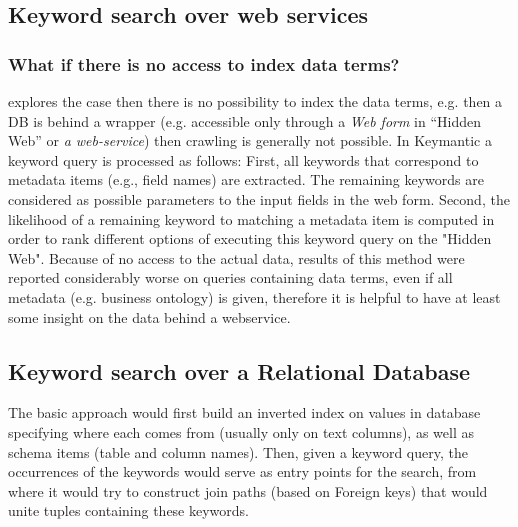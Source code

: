 \subsection{Keyword search over web services}

\subsubsection*{What if there is no access to index data terms?}
\cite{Keymantic10, semantics_without_access} explores the case then there is no possibility to index the data terms, e.g. then a DB is behind a wrapper (e.g. accessible only through a \textit{Web form} in “Hidden Web” or \textit{a web-service}) then crawling is generally not possible.
%
In Keymantic\cite{Keymantic10} a keyword query is processed as follows: First, all keywords that  correspond to metadata items (e.g., field names) are extracted. The remaining keywords are considered as possible parameters to the input fields in the web form. Second, the likelihood of a remaining keyword to matching a metadata item is computed in order to rank different options of executing this keyword query on the "Hidden Web"\cite[p.942]{ethz2012}. Because of no access to the actual data, results of this method were reported considerably worse on queries containing data terms, even if all metadata (e.g. business ontology) is given\cite{ethz2012}, therefore it is helpful to have at least some insight on the data behind a webservice.

\subsection{Keyword search over a Relational Database}

The basic approach would first build an inverted index on values in database specifying where each comes from (usually only on text columns), as well as schema items (table and column names). 
%
Then, given a keyword query, the occurrences of the keywords would serve as entry points for the search, from where it would try to construct join paths (based on Foreign keys) that would unite tuples containing these keywords.
% 

